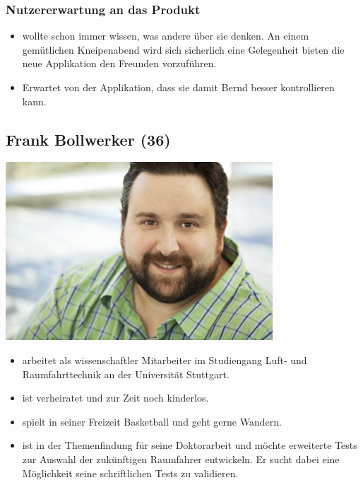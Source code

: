\documentclass[10pt, a4paper, oneside, titlepage]{scrartcl} %
\begin{document}
	\subsubsection{Nutzererwartung an das Produkt}
		\begin{itemize}
		\item{}wollte schon immer wissen, was andere über sie denken. An einem gemütlichen Kneipenabend wird sich sicherlich eine Gelegenheit bieten die neue Applikation den Freunden vorzuführen.
		\item{}Erwartet von der Applikation, dass sie damit Bernd besser kontrollieren kann.
	\end{itemize}	   
   
   	\subsection{Frank Bollwerker (36)}
   	\begin{center}
		\includegraphics[width=10.0cm]{persona_02.jpg}
	\end{center}
	\begin{itemize}
		\item{}arbeitet als wissenschaftler Mitarbeiter im Studiengang Luft- und Raumfahrttechnik an der Universität Stuttgart.
		\item{}ist verheiratet und zur Zeit noch kinderlos. 
		\item{}spielt in seiner Freizeit Basketball und geht gerne Wandern.
		\item{}ist in der Themenfindung für seine Doktorarbeit und möchte erweiterte Tests zur Auswahl der zukünftigen Raumfahrer entwickeln. Er sucht dabei eine 		Möglichkeit seine schriftlichen Tests zu validieren.
	\end{itemize}		
\end{document}
